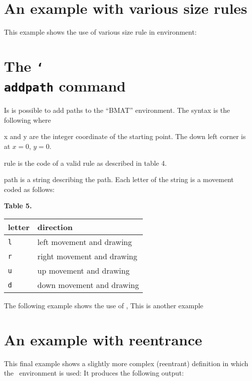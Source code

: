 \documentclass[a4paper,final,11pt]{article}
\begin{document}
\section{An example with various size rules}
This example shows the use of various size rule in  
environment:
%


\section{The \texttt{\char`\\addpath} command}
Is is possible to add paths to the ``BMAT'' environment. The syntax 
is the following
%
%
where
\begin{desc}
  \item[x and y]
  are the integer coordinate of the starting point.
  The down left corner is at $x=0$, $y=0$.
  \item[rule]
  is the code of a valid rule as described in table 4.
  \item[path]
  is a string describing the path.  Each letter of the string is a
  movement coded as follows:
  \begin{center}
    \par
    \textbf{Table 5.} \\[1em]
    \begin{tabular}{|l|l|}
      \hline
      letter & direction \\
      \hline
      \verb|l| & left movement and drawing \\
      \verb|r| & right movement and drawing \\
      \verb|u| & up movement and drawing \\
      \verb|d| & down movement and drawing \\
      \hline
    \end{tabular}
    \par
  \end{center}
\end{desc}
The following example shows the use of ,
This is another example


\section{An example with reentrance}
This final example shows a slightly more complex (reentrant)
definition in which the ~environment is used:
It produces the following output:
\end{document}
